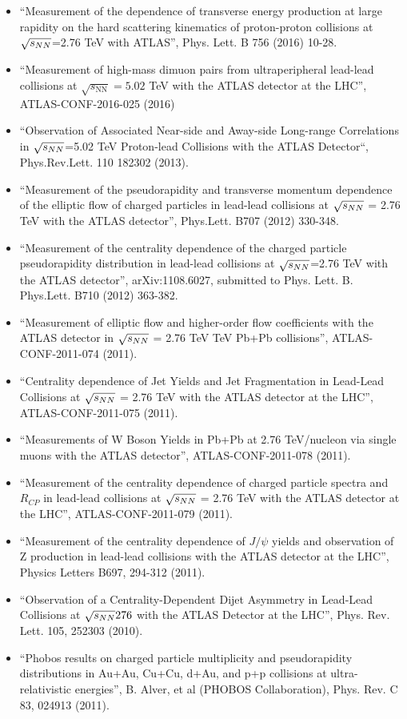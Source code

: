 \documentclass[11 pt]{article}
\begin{document}
\begin{description}
\begin{itemize}
\item ``Measurement of the dependence of transverse energy production at large rapidity on the hard scattering kinematics of proton-proton collisions at $\sqrt{s_{NN}}$=2.76 TeV with ATLAS'', Phys. Lett. B 756 (2016) 10-28.
\item ``Measurement of high-mass dimuon pairs from ultraperipheral lead-lead collisions at $\sqrt{s_{\mathrm{NN}}}=5.02$ TeV with the ATLAS detector at the LHC'', ATLAS-CONF-2016-025 (2016)
\item ``Observation of Associated Near-side and Away-side Long-range Correlations in $\sqrt{s_{NN}}$=5.02 TeV Proton-lead Collisions with the ATLAS Detector``, Phys.Rev.Lett. 110 182302 (2013).
\item ``Measurement of the pseudorapidity and transverse momentum dependence of the elliptic flow of charged particles in lead-lead collisions at $\sqrt{s_{NN}}$ = 2.76 TeV with the ATLAS detector'', Phys.Lett. B707 (2012) 330-348.
\item  ``Measurement of the centrality dependence of the charged particle pseudorapidity distribution in lead-lead collisions at $\sqrt{s_{NN}}$=2.76 TeV with the ATLAS detector'', arXiv:1108.6027, submitted to Phys. Lett. B.  Phys.Lett. B710 (2012) 363-382.
\item  ``Measurement of elliptic flow and higher-order flow coefficients with the ATLAS detector in $\sqrt{s_{NN}}$ = 2.76 TeV TeV Pb+Pb collisions'', ATLAS-CONF-2011-074 (2011).
\item ``Centrality dependence of Jet Yields and Jet Fragmentation in Lead-Lead Collisions at $\sqrt{s_{NN}}$ = 2.76 TeV with the ATLAS detector at the LHC'', ATLAS-CONF-2011-075 (2011).
\item ``Measurements of W Boson Yields in Pb+Pb at 2.76 TeV/nucleon via single muons with the ATLAS detector'', ATLAS-CONF-2011-078 (2011).
\item ``Measurement of the centrality dependence of charged particle spectra and $R_{CP}$ in lead-lead collisions at $\sqrt{s_{NN}}$ = 2.76 TeV with the ATLAS detector at the LHC'', ATLAS-CONF-2011-079 (2011).
\item ``Measurement of the centrality dependence of $J/\psi$ yields and observation of Z production in lead-lead collisions with the ATLAS detector at the LHC'', Physics Letters B697, 294-312 (2011).
\item ``Observation of a Centrality-Dependent Dijet Asymmetry in Lead-Lead Collisions at $\sqrt{s_{NN}}276$ with the ATLAS Detector at the LHC'', Phys. Rev. Lett. 105, 252303 (2010).
\item ``Phobos results on charged particle multiplicity and pseudorapidity distributions in Au+Au, Cu+Cu, d+Au, and p+p collisions at ultra-relativistic energies'', B. Alver, et al (PHOBOS Collaboration), Phys. Rev. C 83, 024913 (2011).

\end{itemize}
\end{description}
\end{document}
